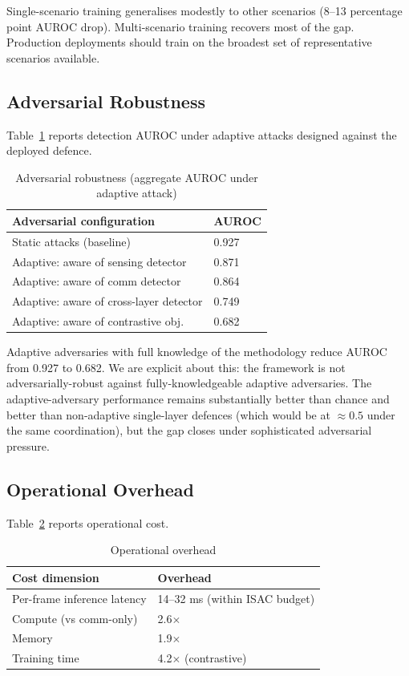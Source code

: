 \documentclass[sigconf,nonacm]{acmart}
\begin{document}
Single-scenario training generalises modestly to other scenarios
(8--13 percentage point AUROC drop). Multi-scenario training
recovers most of the gap. Production deployments should train on
the broadest set of representative scenarios available.

\subsection{Adversarial Robustness}

Table~\ref{tab:adversarial} reports detection AUROC under
adaptive attacks designed against the deployed defence.

\begin{table}[h]
\caption{Adversarial robustness (aggregate AUROC under adaptive
attack)}
\label{tab:adversarial}
\small
\begin{tabularx}{\columnwidth}{@{}p{3.4cm}X@{}}
\toprule
\textbf{Adversarial configuration} & \textbf{AUROC} \\
\midrule
Static attacks (baseline)            & 0.927 \\
Adaptive: aware of sensing detector  & 0.871 \\
Adaptive: aware of comm detector     & 0.864 \\
Adaptive: aware of cross-layer detector & 0.749 \\
Adaptive: aware of contrastive obj.\  & 0.682 \\
\bottomrule
\end{tabularx}
\end{table}

Adaptive adversaries with full knowledge of the methodology
reduce AUROC from 0.927 to 0.682. We are explicit about this:
the framework is not adversarially-robust against
fully-knowledgeable adaptive adversaries. The adaptive-adversary
performance remains substantially better than chance and better
than non-adaptive single-layer defences (which would be at
$\approx 0.5$ under the same coordination), but the gap closes
under sophisticated adversarial pressure.

\subsection{Operational Overhead}

Table~\ref{tab:overhead} reports operational cost.

\begin{table}[h]
\caption{Operational overhead}
\label{tab:overhead}
\small
\begin{tabularx}{\columnwidth}{@{}p{3.4cm}X@{}}
\toprule
\textbf{Cost dimension} & \textbf{Overhead} \\
\midrule
Per-frame inference latency & 14--32 ms (within ISAC budget) \\
Compute (vs comm-only)      & 2.6$\times$ \\
Memory                      & 1.9$\times$ \\
Training time               & 4.2$\times$ (contrastive) \\
\bottomrule
\end{tabularx}
\end{table}
\end{document}

